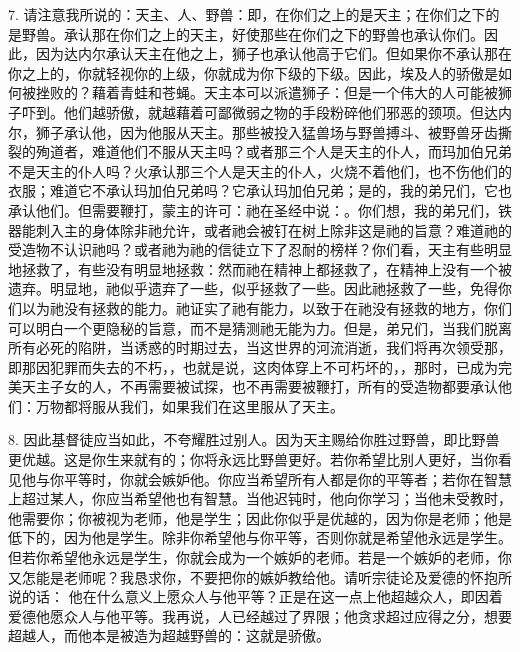 7. 请注意我所说的：天主、人、野兽：即，在你们之上的是天主；在你们之下的是野兽。承认那在你们之上的天主，好使那些在你们之下的野兽也承认你们。因此，因为达内尔承认天主在他之上，狮子也承认他高于它们。但如果你不承认那在你之上的，你就轻视你的上级，你就成为你下级的下级。因此，埃及人的骄傲是如何被挫败的？藉着青蛙和苍蝇。天主本可以派遣狮子：但是一个伟大的人可能被狮子吓到。他们越骄傲，就越藉着可鄙微弱之物的手段粉碎他们邪恶的颈项。但达内尔，狮子承认他，因为他服从天主。那些被投入猛兽场与野兽搏斗、被野兽牙齿撕裂的殉道者，难道他们不服从天主吗？或者那三个人是天主的仆人，而玛加伯兄弟不是天主的仆人吗？火承认那三个人是天主的仆人，火烧不着他们，也不伤他们的衣服；难道它不承认玛加伯兄弟吗？它承认玛加伯兄弟；是的，我的弟兄们，它也承认他们。但需要鞭打，蒙主的许可：祂在圣经中说：。你们想，我的弟兄们，铁器能刺入主的身体除非祂允许，或者祂会被钉在树上除非这是祂的旨意？难道祂的受造物不认识祂吗？或者祂为祂的信徒立下了忍耐的榜样？你们看，天主有些明显地拯救了，有些没有明显地拯救：然而祂在精神上都拯救了，在精神上没有一个被遗弃。明显地，祂似乎遗弃了一些，似乎拯救了一些。因此祂拯救了一些，免得你们以为祂没有拯救的能力。祂证实了祂有能力，以致于在祂没有拯救的地方，你们可以明白一个更隐秘的旨意，而不是猜测祂无能为力。但是，弟兄们，当我们脱离所有必死的陷阱，当诱惑的时期过去，当这世界的河流消逝，我们将再次领受那，即那因犯罪而失去的不朽，，也就是说，这肉体穿上不可朽坏的，，那时，已成为完美天主子女的人，不再需要被试探，也不再需要被鞭打，所有的受造物都要承认他们：万物都将服从我们，如果我们在这里服从了天主。\par

8. 因此基督徒应当如此，不夸耀胜过别人。因为天主赐给你胜过野兽，即比野兽更优越。这是你生来就有的；你将永远比野兽更好。若你希望比别人更好，当你看见他与你平等时，你就会嫉妒他。你应当希望所有人都是你的平等者；若你在智慧上超过某人，你应当希望他也有智慧。当他迟钝时，他向你学习；当他未受教时，他需要你；你被视为老师，他是学生；因此你似乎是优越的，因为你是老师；他是低下的，因为他是学生。除非你希望他与你平等，否则你就是希望他永远是学生。但若你希望他永远是学生，你就会成为一个嫉妒的老师。若是一个嫉妒的老师，你又怎能是老师呢？我恳求你，不要把你的嫉妒教给他。请听宗徒论及爱德的怀抱所说的话： 他在什么意义上愿众人与他平等？正是在这一点上他超越众人，即因着爱德他愿众人与他平等。我再说，人已经越过了界限；他贪求超过应得之分，想要超越人，而他本是被造为超越野兽的：这就是骄傲。\par


